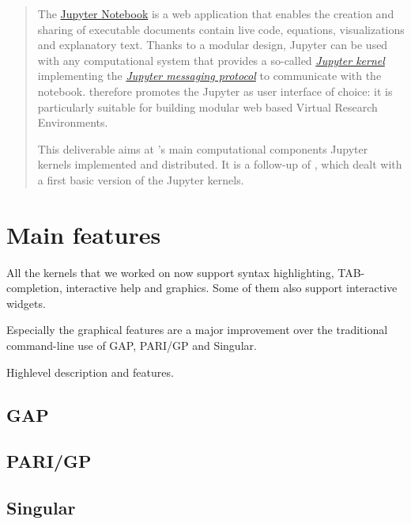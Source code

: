 \documentclass{deliverablereport}
\author{Jeroen Demeyer, Sebastian Gutsche, Nicolas M.~Thiéry}
\begin{document}
\maketitle
\tableofcontents

\begin{abstract}
The \href{https://jupyter.org}{Jupyter Notebook} is a web application
that enables the creation and sharing of executable documents
contain live code, equations, visualizations and explanatory text.
Thanks to a modular design, Jupyter can be used with any computational
system that provides a so-called
\href{https://jupyter.readthedocs.io/en/latest/projects/kernels.html}{\emph{Jupyter kernel}}
implementing the
\href{https://jupyter-client.readthedocs.io/en/latest}{\emph{Jupyter messaging protocol}}
to communicate with the notebook.
\ODK therefore promotes the Jupyter as user interface of choice:
it is particularly suitable for building modular web based Virtual Research Environments.

This deliverable aims at \ODK's main computational components
Jupyter kernels implemented and distributed.
It is a follow-up of ,
which dealt with a first basic version of the Jupyter kernels.
\end{abstract}

\section{Main features}

All the kernels that we worked on now support syntax highlighting, TAB-completion,
interactive help and graphics. Some of them also support interactive widgets.

Especially the graphical features are a major improvement over the traditional
command-line use of GAP, PARI/GP and Singular.

Highlevel description and features.

\subsection {GAP}

\subsection {PARI/GP}

\subsection {Singular}
\end{document}
